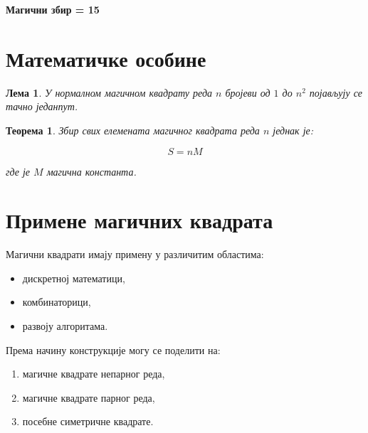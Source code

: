 \documentclass[12pt,a4paper]{article}
\newtheorem{theorem}{Теорема}
\newtheorem{lemma}{Лема}
\begin{document}
\vspace{0.3cm}

\begin{center}
{\large\bfseries\color[HTML]{659EC7}Магични збир = 15}
\end{center}








\section{Математичке особине}



\begin{lemma}

У нормалном магичном квадрату реда $n$ бројеви од $1$ до $n^2$ појављују се
тачно једанпут.

\end{lemma}



\begin{theorem}

Збир свих елемената магичног квадрата реда $n$ једнак је:

\[
S=nM
\]

где је $M$ магична константа.

\end{theorem}




\section{Примене магичних квадрата}



Магични квадрати имају примену у различитим областима:


\begin{itemize}

\item дискретној математици,

\item комбинаторици,

\item развоју алгоритама.

\end{itemize}



Према начину конструкције могу се поделити на:


\begin{enumerate}

\item магичне квадрате непарног реда,

\item магичне квадрате парног реда,

\item посебне симетричне квадрате.

\end{enumerate}
\end{document}
